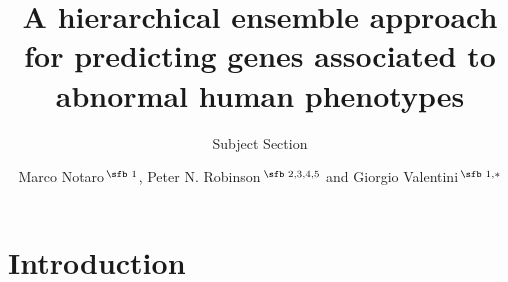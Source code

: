 \documentclass{bioinfo}
\begin{document}

\subtitle{Subject Section}



\title[A hierarchical ensemble for HPO term prediction]{A hierarchical ensemble approach for predicting genes associated to abnormal human phenotypes}
\author[Sample \textit{et~al}.]{Marco Notaro\,$^{\text{\sfb 1}}$, Peter N. Robinson\,$^{\text{\sfb 2,3,4,5}}$ and Giorgio Valentini\,$^{\text{\sfb 1,}*}$}
\address{$^{\text{\sf 1}}$Anacleto Lab - Dipartimento di Informatica, Universit\'a degli Studi di Milano, Via Comelico 39, 20135 Milano, Italy \\
$^{\text{\sf 2}}$Institute for Medical and Human Genetics, Charite-Universitatsmedizin Berlin, Augustenburger Platz 1, 13353 Berlin, Germany\\
$^{\text{\sf 3}}$Max Planck Institute for Molecular Genetics, Ihnestrasse 63-73, 14195 Berlin, Germany\\
$^{\text{\sf 4}}$The Jackson Laboratory for Genomic Medicine, 10 Discovery Drive. Farmington, CT 06032, USA\\
$^{\text{\sf 5}}$Institute for Systems Genomics, University of Connecticut, Farmington, CT 06032, USA
}








\maketitle

\section{Introduction}
 
\end{document}
